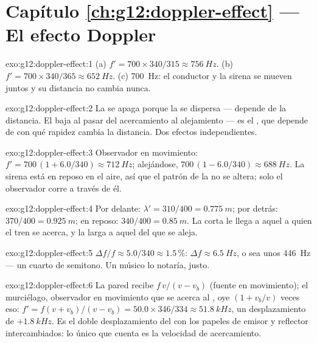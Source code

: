 \section*{Capítulo \ref{ch:g12:doppler-effect} --- El efecto Doppler}

\begin{solution}{exo:g12:doppler-effect:1}
(a) $f' = 700 \times 340/315 \approx \qty{756}{Hz}$.
(b) $f' = 700 \times 340/365 \approx \qty{652}{Hz}$.
(c) \qty{700}{Hz}: el conductor y la sirena se mueven juntos y su
distancia no cambia nunca.
\end{solution}

\begin{solution}{exo:g12:doppler-effect:2}
La \emph{} se apaga porque la  se dispersa --- depende de
la distancia. El \emph{} baja al pasar del acercamiento al
alejamiento --- es el , que depende de con qué rapidez
cambia la distancia. Dos efectos independientes.
\end{solution}

\begin{solution}{exo:g12:doppler-effect:3}
Observador en movimiento:
$f' = 700\,(1 + 6.0/340) \approx \qty{712}{Hz}$; alejándose,
$700\,(1 - 6.0/340) \approx \qty{688}{Hz}$. La sirena está en reposo en
el aire, así que el patrón de la  no se altera; solo el observador
corre a través de él.
\end{solution}

\begin{solution}{exo:g12:doppler-effect:4}
Por delante: $\lambda' = 310/400 = \qty{0.775}{m}$; por detrás:
$370/400 = \qty{0.925}{m}$; en reposo: $340/400 = \qty{0.85}{m}$. La
 corta le llega a aquel a quien el tren se acerca, y la
larga a aquel del que se aleja.
\end{solution}

\begin{solution}{exo:g12:doppler-effect:5}
$\Delta f/f \approx 5.0/340 \approx 1.5\,\%$: $\Delta f \approx
\qty{6.5}{Hz}$, o sea unos \qty{446}{Hz} --- un cuarto de semitono. Un
músico lo notaría, justo.
\end{solution}

\begin{solution}{exo:g12:doppler-effect:6}
La pared recibe $f\,v/(v - v_b)$ (fuente en movimiento); el murciélago,
observador en movimiento que se acerca al , oye $(1 + v_b/v)$ veces
eso: $f' = f(v + v_b)/(v - v_b) = 50.0 \times 346/334 \approx
\qty{51.8}{kHz}$, un desplazamiento de $+\qty{1.8}{kHz}$. Es el doble
desplazamiento del  con los papeles de emisor y reflector
intercambiados: lo único que cuenta es la velocidad de acercamiento.
\end{solution}


